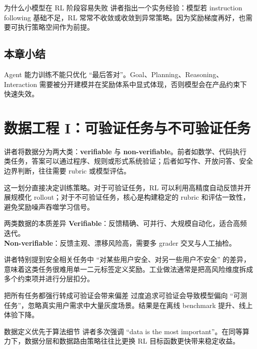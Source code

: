 \documentclass[a4paper]{article}
\begin{document}
\begin{knowledgebox}{为什么小模型在 RL 阶段容易失败}
讲者指出一个实务经验：模型若 instruction following 基础不足，RL 常常不收敛或收敛到异常策略。因为奖励梯度再好，也需要可执行策略空间作为前提。
\end{knowledgebox}

\subsection{本章小结}
Agent 能力训练不能只优化 ``最后答对''。Goal、Planning、Reasoning、Interaction 需要被分开建模并在奖励体系中显式体现，否则模型会在产品约束下快速失效。

\section{数据工程 I：可验证任务与不可验证任务}

讲者将数据分为两大类：\textbf{verifiable} 与 \textbf{non-verifiable}。前者如数学、代码执行类任务，答案可以通过程序、规则或形式系统验证；后者如写作、开放问答、安全边界判断，往往需要 rubric 或模型评估。

这一划分直接决定训练策略。对于可验证任务，RL 可以利用高精度自动反馈并开展规模化 rollout；对于不可验证任务，核心是构建稳定的 rubric 和评估一致性，避免奖励噪声吞噬学习信号。

\begin{knowledgebox}{两类数据的本质差异}
\textbf{Verifiable}：反馈精确、可并行、大规模自动化，适合高频迭代。\\
\textbf{Non-verifiable}：反馈主观、漂移风险高，需要多 grader 交叉与人工抽检。
\end{knowledgebox}

讲者特别提到安全相关任务中 ``对某些用户安全、对另一些用户不安全'' 的差异，意味着这类任务很难用单一二元标签定义奖励。工业做法通常是把高风险维度拆成多个约束项并进行分层扣分。

\begin{warningbox}{把所有任务都强行转成可验证会带来偏差}
过度追求可验证会导致模型偏向 ``可测任务''，忽略真实用户需求中大量灰度场景。结果是在离线 benchmark 提升、线上体验下降。
\end{warningbox}

\begin{importantbox}{数据定义优先于算法细节}
讲者多次强调 ``data is the most important''。在同等算力下，数据分层和数据路由策略往往比更换 RL 目标函数更快带来稳定收益。
\end{importantbox}
\end{document}
